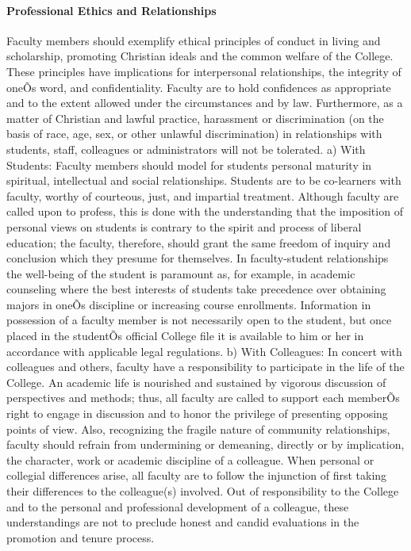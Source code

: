 \documentclass[letterpaper, 11pt]{article}
\begin{document}
			\paragraph{Professional Ethics and Relationships}
				Faculty members should exemplify ethical principles of conduct in living and scholarship, promoting Christian ideals and the common welfare of the College.  These principles have implications for interpersonal relationships, the integrity of oneÕs word, and confidentiality.  Faculty are to hold confidences as appropriate and to the extent allowed under the circumstances and by law.  Furthermore, as a matter of Christian and lawful practice, harassment or discrimination (on the basis of race, age, sex, or other unlawful discrimination) in relationships with students, staff, colleagues or administrators will not be tolerated.
				a) With Students:  Faculty members should model for students personal maturity in spiritual, intellectual and social relationships.  Students are to be co-learners with faculty, worthy of courteous, just, and impartial treatment.  Although faculty are called upon to profess, this is done with the understanding that the imposition of personal views on students is contrary to the spirit and process of liberal education; the faculty, therefore, should grant the same freedom of inquiry and conclusion which they presume for themselves.  In faculty-student relationships the well-being of the student is paramount as, for example, in academic counseling where the best interests of students take precedence over obtaining majors in oneÕs discipline or increasing course enrollments.  Information in possession of a faculty member is not necessarily open to the student, but once placed in the studentÕs official College file it is available to him or her in accordance with applicable legal regulations.
				b) With Colleagues:  In concert with colleagues and others, faculty have a responsibility to participate in the life of the College.  An academic life is nourished and sustained by vigorous discussion of perspectives and methods; thus, all faculty are called to support each memberÕs right to engage in discussion and to honor the privilege of presenting opposing points of view.  Also, recognizing the fragile nature of community relationships, faculty should refrain from undermining or demeaning, directly or by implication, the character, work or academic discipline of a colleague. When personal or collegial differences arise, all faculty are to follow the injunction of first taking their differences to the colleague(s) involved.  Out of responsibility to the College and to the personal and professional development of a colleague, these understandings are not to preclude honest and candid evaluations in the promotion and tenure process.
\end{document}
